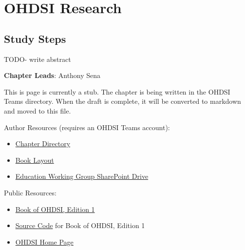 \documentclass[
  letterpaper,
  paper=7in:10in,
  pagesize=pdftex,
  headinclude=on,
  footinclude=on,
  12pt]{scrbook}
\providecommand{\tightlist}{%
  \setlength{\itemsep}{0pt}\setlength{\parskip}{0pt}}\usepackage{longtable,booktabs,array}
\begin{document}
\part{OHDSI Research}

\chapter{Study Steps}\label{sec-research-steps}

TODO- write abstract

\hfill\break

\textbf{Chapter Leads}: Anthony Sena

\begin{tcolorbox}[enhanced jigsaw, opacitybacktitle=0.6, coltitle=black, colback=white, bottomrule=.15mm, bottomtitle=1mm, title=\textcolor{quarto-callout-note-color}{\faInfo}\hspace{0.5em}{Note}, titlerule=0mm, rightrule=.15mm, colbacktitle=quarto-callout-note-color!10!white, colframe=quarto-callout-note-color-frame, toptitle=1mm, arc=.35mm, left=2mm, breakable, opacityback=0, leftrule=.75mm, toprule=.15mm]

This is page is currently a stub. The chapter is being written in the
OHDSI Teams directory. When the draft is complete, it will be converted
to markdown and moved to this file.

Author Resources (requires an OHDSI Teams account):

\begin{itemize}
\tightlist
\item
  \href{https://ohdsiorg.sharepoint.com/sites/Workgroup-EducationWorkingGroup/Shared\%20Documents/Forms/AllItems.aspx?id=\%2Fsites\%2FWorkgroup\%2DEducationWorkingGroup\%2FShared\%20Documents\%2FSection\%20V\%20\%2D\%20Studies\%2FChapter\%2020\%20Study\%20Steps&viewid=05fec2cc\%2Dec8a\%2D4d04\%2Db565\%2Dcf1289b96f67}{Chapter
  Directory}
\item
  \href{https://ohdsiorg.sharepoint.com/:x:/r/sites/Workgroup-EducationWorkingGroup/_layouts/15/Doc2.aspx?action=edit&sourcedoc=\%7B1fa31e39-1c5f-4918-b878-609ebd9810b3\%7D&wdOrigin=TEAMS-WEB.teamsSdk_ns.rwc&wdExp=TEAMS-TREATMENT&wdhostclicktime=1748104477731&web=1}{Book
  Layout}
\item
  \href{https://ohdsiorg.sharepoint.com/sites/Workgroup-EducationWorkingGroup/Shared\%20Documents/Forms/AllItems.aspx?viewid=05fec2cc\%2Dec8a\%2D4d04\%2Db565\%2Dcf1289b96f67}{Education
  Working Group SharePoint Drive}
\end{itemize}

Public Resources:

\begin{itemize}
\tightlist
\item
  \href{https://ohdsi.github.io/TheBookOfOhdsi/}{Book of OHDSI, Edition
  1}
\item
  \href{https://github.com/OHDSI/TheBookOfOhdsi}{Source Code} for Book
  of OHDSI, Edition 1
\item
  \href{https://ohdsi.org/}{OHDSI Home Page}
\end{itemize}

\end{tcolorbox}
\end{document}
